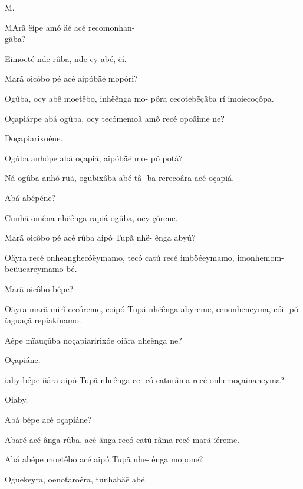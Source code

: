 \documentclass[openany,titlepage,12pt]{book}
\renewcommand{\chaptermark}[1]{\markboth{#1}{}}
\renewcommand{\sectionmark}[1]{\gdef\rightmark{#1}}
\newcommand{\comecalista}[5]{
    \hspace*{-11.7pt}
    \begin{minipage}[t]{0.08\linewidth}
        \flushright #1\\#2
    \end{minipage}
    \hspace{0pt}
    \begin{minipage}[t]{0.94\linewidth}
        \lettrine
        [findent =2pt, nindent=0pt,  lines=2]
        {#3}{#4}#5
    \end{minipage}
    \vspace*{-3pt}
}
\begin{document}
\chaptermark{Dialogo IV.}
\sectionmark{Honrarás a teu pay, \&c.}
\vspace*{10pt}

\comecalista{M.}{}{M}{A}
{rã ëípe amó äé acé recomonhan-\\
    \hspace*{2ex}gâba?
}

\begin{altereven}
    \item Eimöeté nde rûba, nde cy abé, ëí.
    \item Marã oicôbo pé acé aipóbäé mopôri?
    \item Ogûba, ocy abê moetêbo, inhëênga mo-
        pôra cecoteb\~eçâba rí imoiecoçôpa.
    \item Oçapiárpe abá ogûba, ocy tecómemoã
        amõ recé opoâime ne?
    \item Doçapiarixoéne.
    \item Ogûba anhópe abá oçapiá, aipóbäé mo-
        pô potá?
    \item Ná ogûba anhó rüã, ogubixâba abé tâ-
        ba rerecoâra acé oçapiá.
    \item Abá abépéne?
    \item Cunhã omêna nhëênga rapiá ogûba, ocy
        çórene.
    \item Marã oicôbo pé acé rûba aipó Tupã nhë-
        ênga abyú?
    \item Oäyra recé onheanghecóëymamo, tecó
        catú recé imböéeymamo, imonhemom-\linebreak
        beüucareymamo bé.
    \item Marã oicôbo bépe?
    \item Oäyra marã mir\~i cecóreme, coipó Tupã
        nhëênga abyreme, cenonheneyma, cói-\linebreak
        pó ïaguaçá repiakínamo.
    \item Aépe mïauçûba noçapiaririxóe oiâra\linebreak
        nheênga ne?
    \item Oçapiáne.
    \item iaby bépe iiâra aipó Tupã nheênga ce-\linebreak
    \newpage
        có caturâma recé onhemoçainaneyma?
    \item Oiaby.
    \item Abá bépe acé oçapiáne?
    \item Abaré acé ânga rûba, acé ânga recó catú
        râma recé marã ïéreme.
    \item Abá abépe moetêbo acé aipó Tupã nhe-
        ênga mopone?
    \item Oguekeyra, oenotaroéra, tunhabä\~e abé.
\end{altereven}
\end{document}
